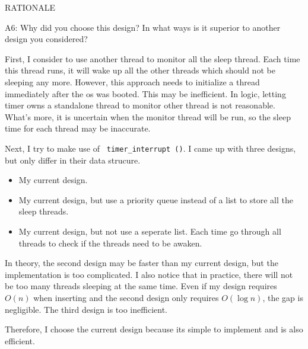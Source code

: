 \begin{aspect}{RATIONALE}
  \begin{qc}
    A6: Why did you choose this design?  In what ways is it superior to another design you considered?
  \end{qc}
  First, I consider to use another thread to monitor all the sleep thread. Each time this thread runs, it will wake up all the other threads which should not be sleeping any more. However, this approach needs to initialize a thread immediately after the os was booted. This may be inefficient. In logic, letting timer owns a standalone thread to monitor other thread is not reasonable. What's more, it is uncertain when the monitor thread will be run, so the sleep time for each thread may be inaccurate.

  Next, I try to make use of \lstinline{ timer_interrupt ()}. I came up with three designs, but only differ in their data strucure.
  \begin{itemize}
    \item My current design.
    \item My current design, but use a priority queue instead of a list to store all the sleep threads.
    \item My current design, but not use a seperate list. Each time go through all threads to check if the threads need to be awaken.

  \end{itemize}

  In theory, the second design may be faster than my current design, but the implementation is too complicated. I also notice that in practice, there will not be too many threads sleeping at the same time. Even if my design requires \(O(n)\) when inserting and the second design only requires \(O(\log n)\), the gap is negligible.
  The third design is too inefficient.

  Therefore, I choose the current design because its simple to implement and is also efficient.
\end{aspect}